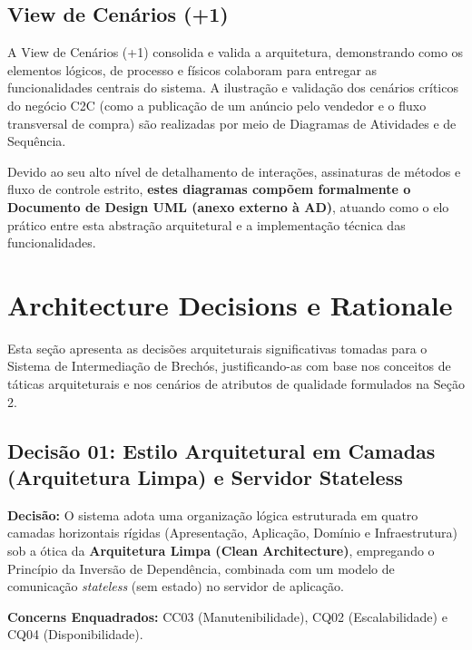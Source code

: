 \documentclass[12pt, a4paper]{article}
\begin{document}
\newpage

\subsection{View de Cenários (+1)}

A View de Cenários (+1) consolida e valida a arquitetura, demonstrando como os elementos lógicos, de processo e físicos colaboram para entregar as funcionalidades centrais do sistema. A ilustração e validação dos cenários críticos do negócio C2C (como a publicação de um anúncio pelo vendedor e o fluxo transversal de compra) são realizadas por meio de Diagramas de Atividades e de Sequência.

Devido ao seu alto nível de detalhamento de interações, assinaturas de métodos e fluxo de controle estrito, \textbf{estes diagramas compõem formalmente o Documento de Design UML (anexo externo à AD)}, atuando como o elo prático entre esta abstração arquitetural e a implementação técnica das funcionalidades.

\newpage

\section{Architecture Decisions e Rationale}

Esta seção apresenta as decisões arquiteturais significativas tomadas para o Sistema de Intermediação de Brechós, justificando-as com base nos conceitos de táticas arquiteturais e nos cenários de atributos de qualidade formulados na Seção 2.

\subsection{Decisão 01: Estilo Arquitetural em Camadas (Arquitetura Limpa) e Servidor Stateless}

\noindent\textbf{Decisão:} O sistema adota uma organização lógica estruturada em quatro camadas horizontais rígidas (Apresentação, Aplicação, Domínio e Infraestrutura) sob a ótica da \textbf{Arquitetura Limpa (Clean Architecture)}, empregando o Princípio da Inversão de Dependência, combinada com um modelo de comunicação \textit{stateless} (sem estado) no servidor de aplicação.

\vspace{0.3cm}
\noindent\textbf{Concerns Enquadrados:} CC03 (Manutenibilidade), CQ02 (Escalabilidade) e CQ04 (Disponibilidade).
\end{document}
